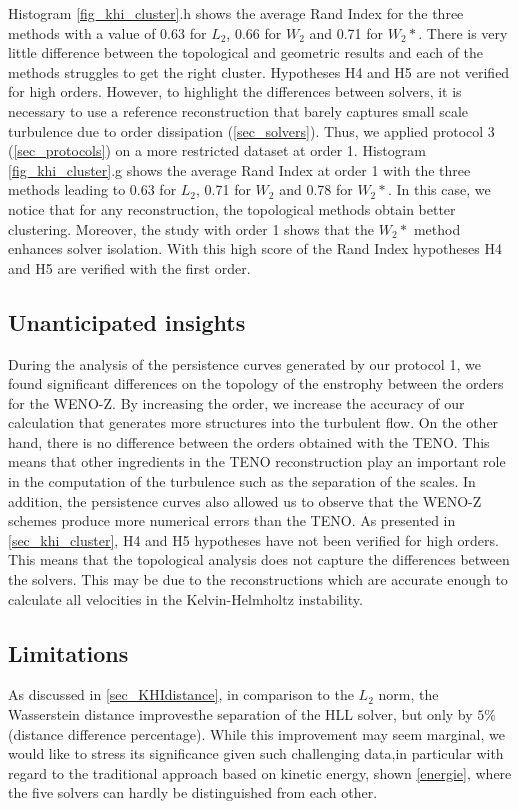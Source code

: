 Histogram \autoref{fig_khi_cluster}.h shows the average Rand Index for the 
three methods with a value of 0.63 for $L_2$, 0.66 for $W_2$ and 0.71 for $W_2*$.
There is very little difference between the topological and geometric results 
and each of the methods struggles to get the right cluster. Hypotheses H4 and H5 
are not verified for high orders. However, to highlight the differences between 
solvers, it is necessary to use a reference reconstruction that barely captures 
small scale turbulence due to order dissipation (\autoref{sec_solvers}).
Thus, we applied protocol 3 (\autoref{sec_protocols}) on a more restricted 
dataset at order 1. Histogram \autoref{fig_khi_cluster}.g shows the average 
Rand 
Index at order 1 with the three methods leading to 0.63 for $L_2$, 0.71 for $W_2$
and 0.78 for $W_2*$. In this case, we notice that for any reconstruction, the 
topological methods obtain better clustering. Moreover, the study with order 1 
shows that the $W_2*$ method enhances solver isolation.
With this
high score of the Rand Index hypotheses H4 and H5 are verified with the first 
order. 

\subsection{Unanticipated insights}
\label{insights}

During the analysis of the persistence curves generated by our protocol 1, we found significant differences on the topology of the enstrophy between the orders for the WENO-Z. By increasing the order, we increase the accuracy of our calculation that generates more structures into the turbulent flow. On the other hand, there is no difference between the orders obtained with the TENO. This means that other ingredients in the TENO reconstruction play an important role in the computation of the turbulence such as the separation of the scales. In addition, the persistence curves also allowed us to observe that the WENO-Z schemes produce more numerical errors than the TENO. As presented in \autoref{sec_khi_cluster}, H4 and H5 hypotheses have not been verified for high orders. This means that the topological analysis does not capture the differences between the solvers. This may be due to the reconstructions which are accurate enough to calculate all velocities in the Kelvin-Helmholtz instability. 

\subsection{Limitations}
As discussed in \autoref{sec_KHIdistance}, in comparison to the $L_2$ norm, the Wasserstein distance
improvesthe separation of the HLL solver, but only by $5 \%$ (distance difference percentage). While this improvement may seem marginal, we would like to stress its significance given such challenging data,in particular with regard to the traditional approach based on kinetic energy, shown \autoref{energie}, where the five solvers can hardly be distinguished from each other.

